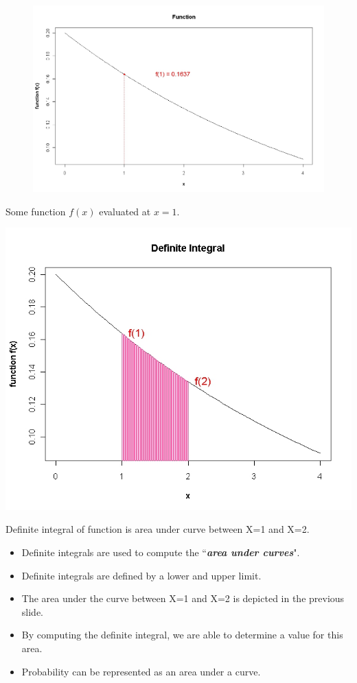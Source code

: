 \documentclass[12pt]{report}
\begin{document}
{\begin{figure}
	\centering
	\includegraphics[width=0.7\linewidth]{images/6AFunction}
	\caption{}
	\label{fig:6AFunction}
\end{figure}


Some function $f(x)$ evaluated at $x=1$.

\begin{center}
	\includegraphics[scale=0.35]{images/6ADefiniteIntegral}
\end{center}
Definite integral of function is area under curve between X=1 and X=2.
\begin{itemize}
	\item Definite integrals are used to compute the ``\textbf{\textit{area under curves}}".
	\item Definite integrals are defined by a lower and upper limit.
	\item The area under the curve between X=1 and  X=2 is depicted in the previous slide.
	\item By computing the definite integral, we are able to determine a value for this area.
	\item Probability can be represented as an area under a curve.
\end{itemize}

}
\end{document}

